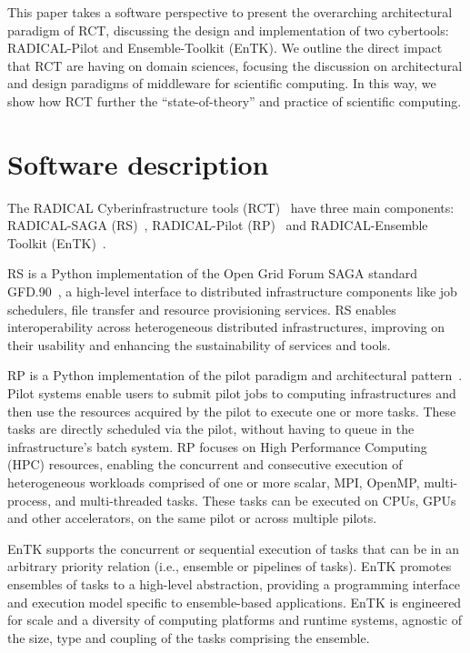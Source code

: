 \documentclass[preprint,12pt, a4paper]{elsarticle}
\begin{document}
This paper takes a software perspective to present the overarching
architectural paradigm of RCT, discussing the design and implementation of
two cybertools: RADICAL-Pilot and Ensemble-Toolkit (EnTK). We outline the
direct impact that RCT are having on domain sciences, focusing the discussion
on architectural and design paradigms of middleware for scientific computing.
In this way, we show how RCT further the ``state-of-theory'' and practice of
scientific computing.


\section{Software description}\label{sec:description}


The RADICAL Cyberinfrastructure tools (RCT)~\cite{github-rct} have three main
components: RADICAL-SAGA (RS)~\cite{merzky2015saga}, RADICAL-Pilot
(RP)~\cite{merzky2018using} and RADICAL-Ensemble Toolkit
(EnTK)~\cite{balasubramanian2018harnessing}.

RS is a Python implementation of the Open Grid Forum SAGA standard 
GFD.90~\cite{goodale2006saga}, a high-level interface to distributed
infrastructure components like job schedulers, file transfer and resource
provisioning services. RS enables interoperability across heterogeneous
distributed infrastructures, improving on their usability and enhancing the
sustainability of services and tools.

RP is a Python implementation of the pilot paradigm and architectural
pattern~\cite{turilli2018comprehensive}. Pilot systems enable users to submit
pilot jobs to computing infrastructures and then use the resources acquired
by the pilot to execute one or more tasks. These tasks are directly scheduled
via the pilot, without having to queue in the infrastructure's batch system.
RP focuses on High Performance Computing (HPC) resources, enabling the
concurrent and consecutive execution of heterogeneous workloads comprised of
one or more scalar, MPI, OpenMP, multi-process, and multi-threaded tasks.
These tasks can be executed on CPUs, GPUs and other accelerators, on the same
pilot or across multiple pilots.

EnTK supports the concurrent or sequential execution of tasks that can be in
an arbitrary priority relation (i.e., ensemble or pipelines of tasks). EnTK
promotes ensembles of tasks to a high-level abstraction, providing a
programming interface and execution model specific to ensemble-based
applications. EnTK is engineered for scale and a diversity of computing
platforms and runtime systems, agnostic of the size, type and coupling of the
tasks comprising the ensemble.
\end{document}
